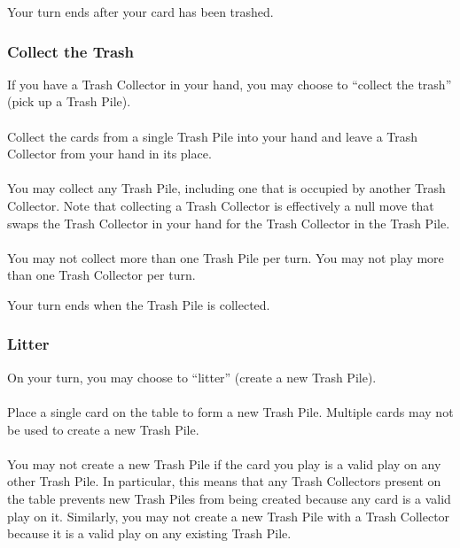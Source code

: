 \documentclass{article}
\begin{document}
Your turn ends after your card has been trashed.

\subsubsection{Collect the Trash \label{sec:collect}}

If you have a Trash Collector in your hand, you may choose to ``collect the trash'' (pick up a Trash Pile).

\paragraph{\label{par:collectplay}}
Collect the cards from a single Trash Pile into your hand and leave a Trash Collector from your hand in its place.

\paragraph{\label{par:collectcollector}}
You may collect any Trash Pile, including one that is occupied by another Trash Collector.
Note that collecting a Trash Collector is effectively a null move that swaps the Trash Collector in your hand for the Trash Collector in the Trash Pile.

\paragraph{\label{par:collectsingle}}
You may not collect more than one Trash Pile per turn. You may not play more than one Trash Collector per turn.

Your turn ends when the Trash Pile is collected.

\subsubsection{Litter \label{sec:litter}}

On your turn, you may choose to ``litter'' (create a new Trash Pile).

\paragraph{\label{par:littercreate}}
Place a single card on the table to form a new Trash Pile. Multiple cards may not be used to create a new Trash Pile.

\paragraph{\label{par:litterrestriction}}
You may not create a new Trash Pile if the card you play is a valid play on any other Trash Pile. In particular, this means that any Trash Collectors present on the table prevents new Trash Piles from being created because any card is a valid play on it. Similarly, you may not create a new Trash Pile with a Trash Collector because it is a valid play on any existing Trash Pile.
\end{document}
